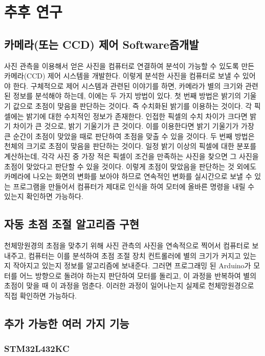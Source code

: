 \section{추후 연구}

\subsection{카메라(또는 CCD) 제어 Software즘개발}

사진 관측을 이용해서 얻은 사진을 컴퓨터로 연결하여 분석이 가능할 수 있도록 만든 카메라(CCD) 제어 시스템을 개발한다. 이렇게 분석한 사진을 컴퓨터로 보낼 수 있어야 한다. 구체적으로 제어 시스템과 관련된 이야기를 하면, 카메라가 별의 크기와 관련된 정보를 분석해야 하는데, 이에는 두 가지 방법이 있다. 첫 번째 방법은 밝기의 기울기 값으로 초점이 맞음을 판단하는 것이다. 즉 수치화된 밝기를 이용하는 것이다. 각 픽셀에는 밝기에 대한 수치적인 정보가 존재한다. 인접한 픽셀의 수치 차이가 크다면 밝기 차이가 큰 것으로, 밝기 기울기가 큰 것이다. 이를 이용한다면 밝기 기울기가 가장 큰 순간이 초점이 맞았을 때로 판단하여 초점을 맞출 수 있을 것이다. 두 번째 방법은 천체의 크기로 초점이 맞음을 판단하는 것이다. 일정 밝기 이상의 픽셀에 대한 분포를 계산하는데, 각각 사진 중 가장 적은 픽셀이 조건을 만족하는 사진을 찾으면 그 사진을 초점이 맞았다고 판단할 수 있을 것이다. 이렇게 초점이 맞았음을 판단하는 것 외에도 카메라에 나오는 화면의 변화를 보아야 하므로 연속적인 변화를 실시간으로 보낼 수 있는 프로그램을 만들어서 컴퓨터가 제대로 인식을 하여 모터에 올바른 명령을 내릴 수 있는지 확인하면 가능하다.

\subsection{자동 초점 조절 알고리즘 구현}

천체망원경의 초점을 맞추기 위해 사진 관측의 사진을 연속적으로 찍어서 컴퓨터로 보내주고, 컴퓨터는 이를 분석하여 초점 조절 장치 컨트롤러에 별의 크기가 커지고 있는지 작아지고 있는지 정보를 알고리즘에 보내준다. 그러면 프로그래밍 된 Arduino가 모터를 어느 방향으로 돌려야 하는지 판단하여 모터를 돌리고, 이 과정을 반복하여 별의 초점이 맞을 때 이 과정을 멈춘다. 이러한 과정이 일어나는지 실제로 천체망원경으로 직접 확인하면 가능하다.

\subsection{추가 가능한 여러 가지 기능}

\subsubsection{STM32L432KC}

